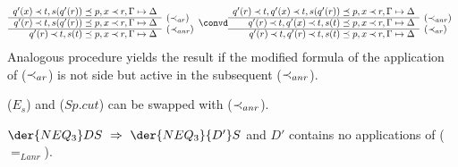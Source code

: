 \begin{PROOF}
\begin{LS}
\[ \begin{array}{rl}
q'(x)\Incl t, s(q'(r))\preceq p, x\Incl r, \Gamma\Seq\Delta \\ \cline{1-1}
q'(r)\Incl t, s(q'(r))\preceq p, x\Incl r, \Gamma\Seq\Delta  &
\raisebox{1.2ex}[1.5ex][0ex]{$(\Incl_{ar})$} \\ \cline{1-1}
q'(r)\Incl t, s(t)\preceq p, x\Incl r, \Gamma\Seq\Delta  &
\raisebox{1.2ex}[1.5ex][0ex]{$(\Incl_{anr})$}
\end{array} \convd
 \begin{array}{rl}
q'(r)\Incl t, q'(x)\Incl t, s(q'(r))\preceq p, x\Incl r, \Gamma\Seq\Delta \\ \cline{1-1}
q'(r)\Incl t, q'(x)\Incl t, s(t)\preceq p, x\Incl r, \Gamma\Seq\Delta  &
\raisebox{1.2ex}[1.5ex][0ex]{$(\Incl_{anr})$} \\ \cline{1-1}
q'(r)\Incl t, q'(r)\Incl t, s(t)\preceq p, x\Incl r, \Gamma\Seq\Delta  &
\raisebox{1.2ex}[1.5ex][0ex]{$(\Incl_{ar})$}
\end{array} \]
Analogous procedure yields the result if the modified formula of the
application of ($\mathbin{\prec}_{ar}$) is not side but active in the subsequent ($\mathbin{\prec}_{anr}$).
%
\item ($E_s$) and ($Sp.cut$) can be swapped with ($\mathbin{\prec}_{anr}$).
\end{LS}
\end{PROOF}
%
\begin{LEMMA}\label{le:noLanr}
 $\der{NEQ_3}DS\ \impl\ \der{NEQ_3}{D'}S$ and $D'$ contains no
applications of ($=_{Lanr}$).
\end{LEMMA}
